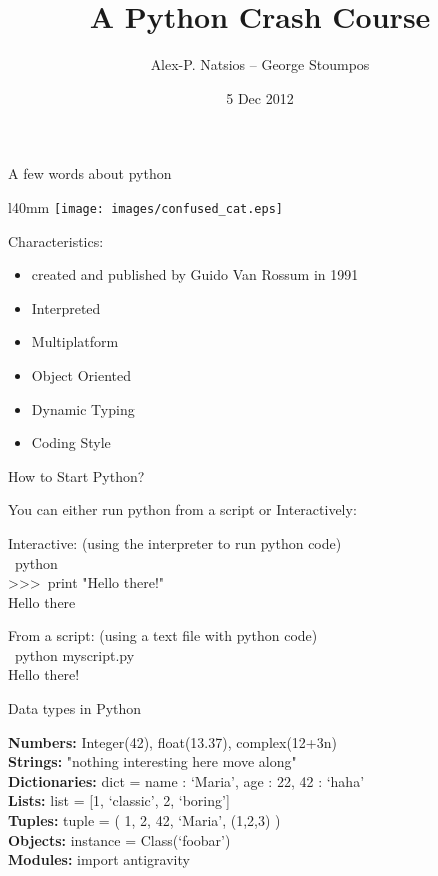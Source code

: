 \documentclass{beamer}
\title[Diving into Python]{A Python Crash Course}
\author{Alex-P. Natsios -- George Stoumpos}
\institute{Technological Institute of Larissa}
\date{5 Dec 2012}
\begin{document}
  \begin{frame}
    \titlepage
  \end{frame}

  \begin{frame}{A few words about python}

    \begin{wrapfigure}{l}{40mm}
      \texttt{[image: images/confused\_cat.eps]}
    \end{wrapfigure}

  Characteristics:
    \begin{itemize}
      \item created and published by Guido Van Rossum in 1991
      \item Interpreted
      \item Multiplatform
      \item Object Oriented
      \item Dynamic Typing
      \item Coding Style
    \end{itemize}

  \end{frame}

  \begin{frame}{How to Start Python?}
    
    You can either run python from a script or Interactively:

    \begin{block}{Interactive:}
      \scriptsize
      (using the interpreter to run python code)\\
      \textdollar \ python\\
      \textgreater\textgreater\textgreater \ print "Hello there!"\\
      Hello there
    \end{block} 

    \begin{block}{From a script:}
      \scriptsize
      (using a text file with python code)\\
      \textdollar \ python myscript.py\\
      Hello there!\\
      \textdollar
    \end{block}

  \end{frame} 

  \begin{frame}{Data types in Python}

    {\bf Numbers:} Integer(42), float(13.37), complex(12+3n)\\
    {\bf Strings:} "nothing interesting here move along"\\
    {\bf Dictionaries:} dict = \textbraceleft name : `Maria', age : 22, 42 : `haha' \textbraceright \\
    {\bf Lists:} list = [1, `classic', 2, `boring']\\
    {\bf Tuples:} tuple = ( 1, 2, 42, `Maria', (1,2,3) )\\
    {\bf Objects:} instance = Class(`foobar')\\
    {\bf Modules:} import antigravity

  \end{frame}
\end{document}
